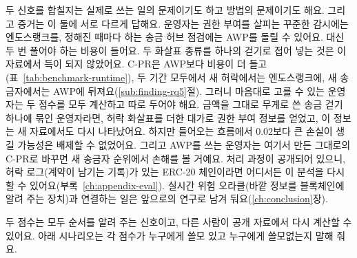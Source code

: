 두 신호를 합칠지는 실제로 쓰는 일의 문제이기도 하고 방법의 문제이기도 해요. 그리고 증거는 이 둘에 서로 다르게 답해요. 운영자는 권한 부여를 살피는 꾸준한 감시에는 엔도스랭크를, 정해진 때마다 하는 송금 허브 점검에는 AWP를 돌릴 수 있어요. 대신 두 번 풀어야 하는 비용이 들어요. 두 화살표 종류를 하나의 걷기로 접어 넣는 것은 이 자료에서 득이 되지 않았어요. C-PR은 AWP보다 비용이 더 들고(표~\ref{tab:benchmark-runtime}), 두 기간 모두에서 새 허락에서는 엔도스랭크에, 새 송금자에서는 AWP에 뒤져요(\ref{sub:finding-rq5}절). 그러니 마음대로 고를 수 있는 운영자는 두 점수를 모두 계산하고 따로 두어야 해요. 금액을 그대로 무게로 쓴 송금 걷기 하나에 묶인 운영자라면, 허락 화살표를 더한 대가로 권한 부여 정보를 얻었고, 이 정보는 새 자료에서도 다시 나타났어요. 하지만 들어오는 흐름에서 $0.02$보다 큰 손실이 생길 가능성은 배제할 수 없었어요. 그리고 AWP를 쓰는 운영자는 여기서 만든 그대로의 C-PR로 바꾸면 새 송금자 순위에서 손해를 볼 거예요. 처리 과정이 공개되어 있으니, 허락 로그(계약이 남기는 기록)가 있는 ERC-20 체인이라면 어디서든 이 분석을 다시 할 수 있어요(부록~\ref{ch:appendix-eval}). 실시간 위험 오라클(바깥 정보를 블록체인에 알려 주는 장치)과 연결하는 일은 앞으로의 연구로 남겨 둬요(\ref{ch:conclusion}장).


두 점수는 모두 순서를 알려 주는 신호이고, 다른 사람이 공개 자료에서 다시 계산할 수 있어요. 아래 시나리오는 각 점수가 누구에게 쓸모 있고 누구에게 쓸모없는지 말해 줘요.

